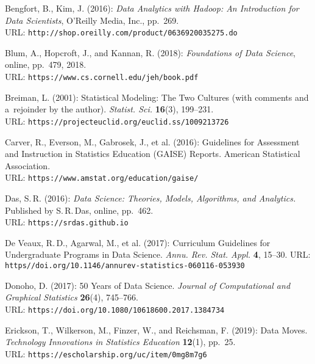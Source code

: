  

\newpage
\renewcommand{\refname}{Literatura}
\begin{thebibliography}{10}
\setlength\itemsep{-1pt}
\frenchspacing

    Bengfort, B., Kim, J. (2016): {\it  Data Analytics with Hadoop: An Introduction for Data Scientists}, O'Reilly Media, Inc., pp.~269.
		\\
		URL: {\tt http://shop.oreilly.com/product/0636920035275.do}

    Blum, A., Hopcroft, J., and Kannan, R. (2018): {\it Foundations of Data Science}, online, pp.~479, 2018. 
		\\
		URL: {\tt https://www.cs.cornell.edu/jeh/book.pdf}
 
    Breiman, L. (2001): Statistical Modeling: The Two Cultures (with comments and a~rejoinder by the author).
    {\it  Statist. Sci.} {\bf 16}(3), 199--231.
		\\
    URL: {\tt https://projecteuclid.org/euclid.ss/1009213726}
    
    Carver, R., Everson, M., Gabrosek, J., et al. (2016):      
    {Guidelines for Assessment and Instruction in Statistics Education (GAISE) Reports}. American Statistical Association.
		\\
    URL: {\tt https://www.amstat.org/education/gaise/}

     Das, S.\,R. (2016): {\it Data Science: Theories, Models, Algorithms, and Analytics.} Published by S.\,R.\,Das,  online, pp.~462.
		 \\
     URL: {\tt https://srdas.github.io}
     
    De Veaux, R.\,D., Agarwal, M., et al. (2017): Curriculum Guidelines for Undergraduate Programs in Data Science. {\it Annu. Rev. Stat. Appl.} {\bf4}, 15--30.
     URL: \\{\tt https//doi.org/10.1146/annurev-statistics-060116-053930}
   
    Donoho, D. (2017): 50 Years of Data Science.  
    {\it Journal of Computational and Graphical Statistics} {\bf 26}(4), 745--766.  
		\\
    URL: {\tt  https://doi.org/10.1080/10618600.2017.1384734}
 
    Erickson, T., Wilkerson, M., Finzer, W., and Reichsman, F. (2019): Data Moves. 
    {\it Technology Innovations in Statistics Education} {\bf 12}(1), pp.~25.
		\\
    URL: {\tt https://escholarship.org/uc/item/0mg8m7g6}
        

\end{thebibliography}
